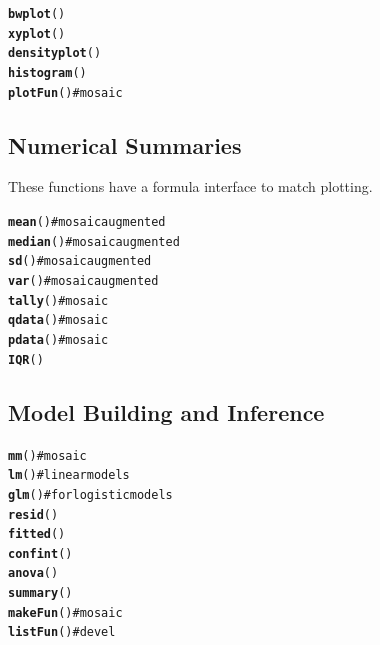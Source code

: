 \documentclass{report}\usepackage{graphicx, color}
\makeatletter
\newcommand{\hlfunctioncall}[1]{\textcolor[rgb]{0.501960784313725,0,0.329411764705882}{\textbf{#1}}}%
\newcommand{\hlcomment}[1]{\textcolor[rgb]{0.180392156862745,0.6,0.341176470588235}{#1}}%
\newenvironment{kframe}{%
 \def\at@end@of@kframe{}%
 \ifinner\ifhmode%
  \def\at@end@of@kframe{\end{minipage}}%
  \begin{minipage}{\columnwidth}%
 \fi\fi%
 \def\FrameCommand##1{\hskip\@totalleftmargin \hskip-\fboxsep
 \colorbox{shadecolor}{##1}\hskip-\fboxsep
     \hskip-\linewidth \hskip-\@totalleftmargin \hskip\columnwidth}%
 \MakeFramed {\advance\hsize-\width
   \@totalleftmargin\z@ \linewidth\hsize
   \@setminipage}}%
 {\par\unskip\endMakeFramed%
 \at@end@of@kframe}
\newenvironment{knitrout}{}{} %
\makeatother
\begin{document}
\begin{multicols}{4}
%
\begin{knitrout}
\color{fgcolor}\begin{kframe}
\begin{alltt}
\hlfunctioncall{bwplot}()
\hlfunctioncall{xyplot}()
\hlfunctioncall{densityplot}()
\hlfunctioncall{histogram}()
\hlfunctioncall{plotFun}() \hlcomment{# mosaic}
\end{alltt}
\end{kframe}
\end{knitrout}


\vfill
\columnbreak

\subsection*{Numerical Summaries}
These functions have 
a formula interface to match plotting.
%
\begin{knitrout}
\color{fgcolor}\begin{kframe}
\begin{alltt}
\hlfunctioncall{mean}()   \hlcomment{# mosaic augmented}
\hlfunctioncall{median}() \hlcomment{# mosaic augmented}
\hlfunctioncall{sd}()     \hlcomment{# mosaic augmented}
\hlfunctioncall{var}()    \hlcomment{# mosaic augmented}
\hlfunctioncall{tally}()  \hlcomment{# mosaic}
\hlfunctioncall{qdata}()  \hlcomment{# mosaic}
\hlfunctioncall{pdata}()  \hlcomment{# mosaic}
\hlfunctioncall{IQR}()
\end{alltt}
\end{kframe}
\end{knitrout}


\subsection*{Model Building and Inference}
%
\begin{knitrout}
\color{fgcolor}\begin{kframe}
\begin{alltt}
\hlfunctioncall{mm}()      \hlcomment{# mosaic}
\hlfunctioncall{lm}()      \hlcomment{# linear models}
\hlfunctioncall{glm}()     \hlcomment{# for logistic models}
\hlfunctioncall{resid}()
\hlfunctioncall{fitted}()
\hlfunctioncall{confint}()
\hlfunctioncall{anova}()
\hlfunctioncall{summary}()
\hlfunctioncall{makeFun}() \hlcomment{# mosaic }
\hlfunctioncall{listFun}() \hlcomment{# devel}
\end{alltt}
\end{kframe}
\end{knitrout}



\end{multicols}
\end{document}
